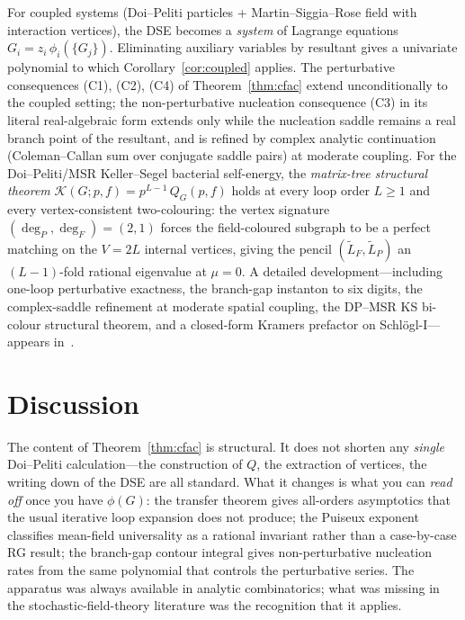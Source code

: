\documentclass[11pt,a4paper]{article}
\theoremstyle{plain}
\theoremstyle{definition}
\begin{document}
For coupled systems (Doi--Peliti particles + Martin--Siggia--Rose
field with interaction vertices), the DSE becomes a
\emph{system} of Lagrange equations $G_i = z_i\,\phi_i(\{G_j\})$.
Eliminating auxiliary variables by resultant gives a univariate
polynomial to which Corollary~\ref{cor:coupled} applies.  The
perturbative consequences (C1), (C2), (C4) of
Theorem~\ref{thm:cfac} extend unconditionally to the coupled
setting; the non-perturbative nucleation consequence (C3) in its
literal real-algebraic form extends only while the nucleation
saddle remains a real branch point of the resultant, and is
refined by complex analytic continuation (Coleman--Callan sum
over conjugate saddle pairs) at moderate coupling.  For the
Doi--Peliti/MSR Keller--Segel bacterial self-energy, the
\emph{matrix-tree structural theorem}
$\mathcal{K}(G; p, f) = p^{L-1}\,Q_G(p, f)$ holds at every loop
order $L \geq 1$ and every vertex-consistent two-colouring: the
vertex signature $(\deg_P, \deg_F) = (2, 1)$ forces the
field-coloured subgraph to be a perfect matching on the $V = 2L$
internal vertices, giving the pencil $(\widetilde L_F, \widetilde L_P)$
an $(L-1)$-fold rational eigenvalue at $\mu = 0$.  A detailed
development---including one-loop perturbative exactness, the
branch-gap instanton to six digits, the complex-saddle refinement
at moderate spatial coupling, the DP--MSR KS bi-colour structural
theorem, and a closed-form Kramers prefactor on Schl\"ogl-I---
appears in~\citep{CFACpaper}.

\section{Discussion}
\label{sec:disc}

The content of Theorem~\ref{thm:cfac} is structural.  It does not
shorten any \emph{single} Doi--Peliti calculation---the construction
of $Q$, the extraction of vertices, the writing down of the DSE
are all standard.  What it changes is what you can \emph{read off}
once you have $\phi(G)$: the transfer theorem gives all-orders
asymptotics that the usual iterative loop expansion does not
produce; the Puiseux exponent classifies mean-field universality
as a rational invariant rather than a case-by-case RG result;
the branch-gap contour integral gives non-perturbative nucleation
rates from the same polynomial that controls the perturbative
series.  The apparatus was always available in analytic
combinatorics; what was missing in the stochastic-field-theory
literature was the recognition that it applies.
\end{document}

